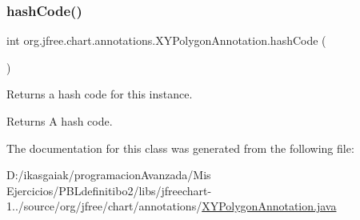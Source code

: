 \subsubsection{\texorpdfstring{hash\+Code()}{hashCode()}}
{\footnotesize\ttfamily int org.\+jfree.\+chart.\+annotations.\+X\+Y\+Polygon\+Annotation.\+hash\+Code (\begin{DoxyParamCaption}{ }\end{DoxyParamCaption})}

Returns a hash code for this instance.

\begin{DoxyReturn}{Returns}
A hash code. 
\end{DoxyReturn}


The documentation for this class was generated from the following file\+:\begin{DoxyCompactItemize}
\item 
D\+:/ikasgaiak/programacion\+Avanzada/\+Mis Ejercicios/\+P\+B\+Ldefinitibo2/libs/jfreechart-\/1../source/org/jfree/chart/annotations/\mbox{\hyperlink{_x_y_polygon_annotation_8java}{X\+Y\+Polygon\+Annotation.\+java}}\end{DoxyCompactItemize}
